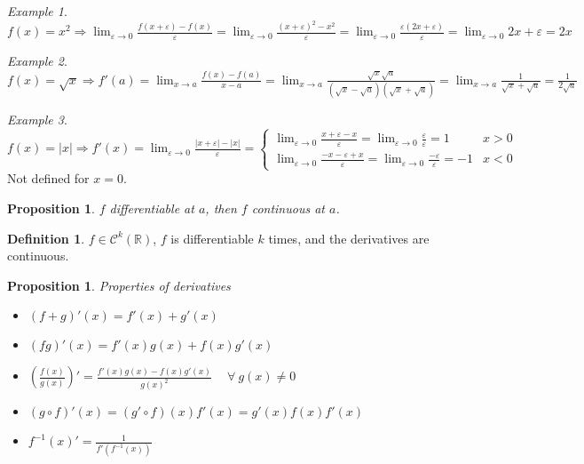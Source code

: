 \documentclass{article}
\newcommand{\DS}{\displaystyle}
\newcommand{\Ar}{\Rightarrow}
\newcommand{\lime}{\lim_{\varepsilon \to 0}}
\newcommand{\limx}[1]{\lim_{x \to #1}}
\theoremstyle{definition}
\newtheorem{definition}{Definition}[section]
\theoremstyle{definition}
\theoremstyle{plain}
\theoremstyle{plain}
\theoremstyle{plain}
\theoremstyle{plain}
\newtheorem{proposition}[theorem]{Proposition}
\theoremstyle{definition}
\theoremstyle{remark}
\newtheorem{exampled}{Example}[definition]
\theoremstyle{remark}
\theoremstyle{remark}
\theoremstyle{remark}
\newcommand{\R}{\mathbb{R}}
\newcommand{\ForAll}{\ \forall \ }
\newcommand{\E}{\varepsilon}
\begin{document}
\begin{exampled}
  $\DS f(x) = x^2 \Ar \lime \frac{f(x+\E)-f(x)}{\E} = \lime \frac{(x+\E)^2 - x^2}{\E} = \lime \frac{\E (2x + \E)}{\E} = \lime 2x + \E = 2x$
\end{exampled}

\begin{exampled}
  $\DS f(x) = \sqrt{x} \Ar f'(a) = \limx{a} \frac{f(x)-f(a)}{x-a} = \limx{a} \frac{\sqrt{x} \sqrt{a}}{(\sqrt{x}-\sqrt{a})(\sqrt{x}+\sqrt{a})} = \limx{a} \frac{1}{\sqrt{x}+\sqrt{a}} = \frac{1}{2\sqrt{a}}$
\end{exampled}

\begin{exampled}
  $\DS f(x) = |x| \Ar f'(x) = \lime \frac{|x+\E| - |x|}{\E} =
    \begin{cases}
      \lime \frac{x + \E - x}{\E} = \lime \frac{\E}{\E} = 1 & x > 0 \\
      \lime \frac{-x - \E + x}{\E} = \lime \frac{-\E}{\E} = -1 & x < 0
    \end{cases}$
  \\Not defined for $x = 0$.
\end{exampled}


\begin{proposition}
  $f$ differentiable at $a$, then $f$ continuous at $a$.
\end{proposition}



\begin{definition}
  $f \in \mathcal{C}^k(\R)$, $f$ is differentiable $k$ times, and the derivatives are continuous.
\end{definition}


\begin{proposition}
  Properties of derivatives
  \begin{itemize}
  \item $(f + g)'(x) = f'(x) + g'(x)$
  \item $(fg)'(x) = f'(x)g(x) + f(x)g'(x)$
  \item $(\frac{f(x)}{g(x)})' = \frac{f'(x)g(x)-f(x)g'(x)}{g(x)^2} \quad \ForAll g(x) \neq 0$
  \item $(g \circ f)'(x) = (g' \circ f)(x)f'(x) = g'(x)f(x)f'(x)$
  \item $f^{-1}(x)' = \frac{1}{f'(f^{-1}(x))}$
  \end{itemize}
\end{proposition}
\end{document}
